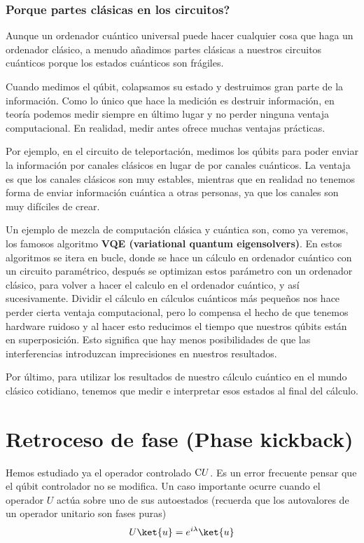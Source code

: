 \documentclass[a4paper,11pt]{book} %
\numberwithin{equation}{chapter}
\newcommand{\cg}[1]{{\rm C}#1}
\begin{document}
		\subsubsection{Porque partes clásicas en los circuitos?}
		
Aunque un ordenador cuántico universal puede hacer cualquier cosa que haga un ordenador clásico, a menudo añadimos partes clásicas a nuestros circuitos cuánticos porque los estados cuánticos son frágiles.

Cuando medimos el qúbit, colapsamos su estado y destruimos gran parte de la información. Como lo único que hace la medición es destruir información, en teoría podemos medir siempre en último lugar y no perder ninguna ventaja computacional. En realidad, medir antes ofrece muchas ventajas prácticas.

Por ejemplo, en el circuito de teleportación, medimos los qúbits para poder enviar la información por canales clásicos en lugar de por canales cuánticos. La ventaja es que los canales clásicos son muy estables, mientras que en realidad no tenemos forma de enviar información cuántica a otras personas, ya que los canales son muy difíciles de crear.

Un ejemplo de mezcla de computación clásica y cuántica son, como ya veremos, los famosos algoritmo \textbf{VQE (variational quantum eigensolvers)}. En estos algoritmos se itera en bucle, donde se hace un cálculo en ordenador cuántico con un circuito paramétrico, después se optimizan estos parámetro con un ordenador clásico, para volver a hacer el calculo en el ordenador cuántico, y así sucesivamente.  Dividir el cálculo en cálculos cuánticos más pequeños nos hace perder cierta ventaja computacional, pero lo compensa el hecho de que tenemos hardware ruidoso y al hacer esto reducimos el tiempo que nuestros qúbits están en superposición. Esto significa que hay menos posibilidades de que las interferencias introduzcan imprecisiones en nuestros resultados.

Por último, para utilizar los resultados de nuestro cálculo cuántico en el mundo clásico cotidiano, tenemos que medir e interpretar esos estados al final del cálculo.




    \section{Retroceso de fase (Phase kickback)}

Hemos estudiado ya el operador controlado $\cg{U}$. Es un error frecuente pensar que el qúbit controlador no se modifica. Un caso importante ocurre cuando el operador $U$ actúa sobre uno de sus autoestados (recuerda que los autovalores de  un operador unitario son fases puras)
	\begin{equation} \label{ec_elementos_U_sobre_eigen}
	U\ket{u} = e^{i\lambda} \ket{u}
	\end{equation}
\end{document}
